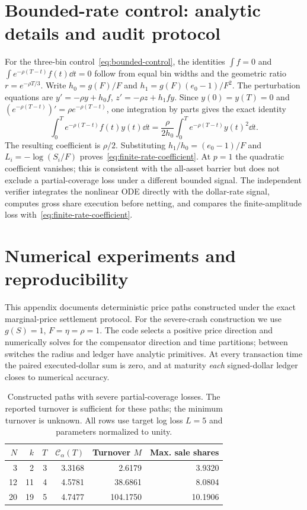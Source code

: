 \documentclass[review,hidelinks,onefignum,onetabnum]{siamonline250211}
\begin{document}
\section{Bounded-rate control: analytic details and audit protocol}\label{app:rate}
For the three-bin control~\eqref{eq:bounded-control}, the identities $\int f=0$ and $\int e^{-\rho(T-t)}f(t)\dd t=0$ follow from equal bin widths and the geometric ratio $r=e^{-\rho T/3}$. Write $h_0=g(F)/F$ and $h_1=g(F)(e_0-1)/F^2$. The perturbation equations are $y'=-\rho y+h_0 f$, $z'=-\rho z+h_1fy$. Since $y(0)=y(T)=0$ and $(e^{-\rho(T-t)})'=\rho e^{-\rho(T-t)}$, one integration by parts gives the exact identity
\begin{equation}\label{eq:ibp}
\int_0^T e^{-\rho(T-t)}f(t)y(t)\dd t
=\frac{\rho}{2h_0}\int_0^T e^{-\rho(T-t)}y(t)^2\dd t.
\end{equation}
The resulting coefficient is $\rho/2$. Substituting $h_1/h_0=(e_0-1)/F$ and $L_i=-\log(S_i/F)$ proves~\eqref{eq:finite-rate-coefficient}. At $p=1$ the quadratic coefficient vanishes; this is consistent with the all-asset barrier but does not exclude a partial-coverage loss under a different bounded signal. The independent verifier integrates the nonlinear ODE directly with the dollar-rate signal, computes gross share execution before netting, and compares the finite-amplitude loss with~\eqref{eq:finite-rate-coefficient}.

\section{Numerical experiments and reproducibility}\label{app:numerics}
This appendix documents deterministic price paths constructed under the exact marginal-price settlement protocol. For the severe-crash construction we use $g(S)=1$, $F=\eta=\rho=1$. The code selects a positive price direction and numerically solves for the compensator direction and time partitions; between switches the radius and ledger have analytic primitives. At every transaction time the paired executed-dollar sum is zero, and at maturity \emph{each} signed-dollar ledger closes to numerical accuracy.

\begin{table}[H]\centering\small
\caption{Constructed paths with severe partial-coverage losses. The reported turnover is sufficient for these paths; the minimum turnover is unknown. All rows use target log loss $L=5$ and parameters normalized to unity.}\label{tab:witness}
\begin{tabular}{@{}rrrrrr@{}}\toprule
$N$ & $k$ & $T$ & $\mathcal C_\alpha(T)$ & Turnover $M$ & Max. sale shares \\\midrule
3 & 2 & 3 & 3.3168 & 2.6179 & 3.9320\\
12 & 11 & 4 & 4.5781 & 38.6861 & 8.0804\\
20 & 19 & 5 & 4.7477 & 104.1750 & 10.1906\\
\bottomrule\end{tabular}
\end{table}
\end{document}
